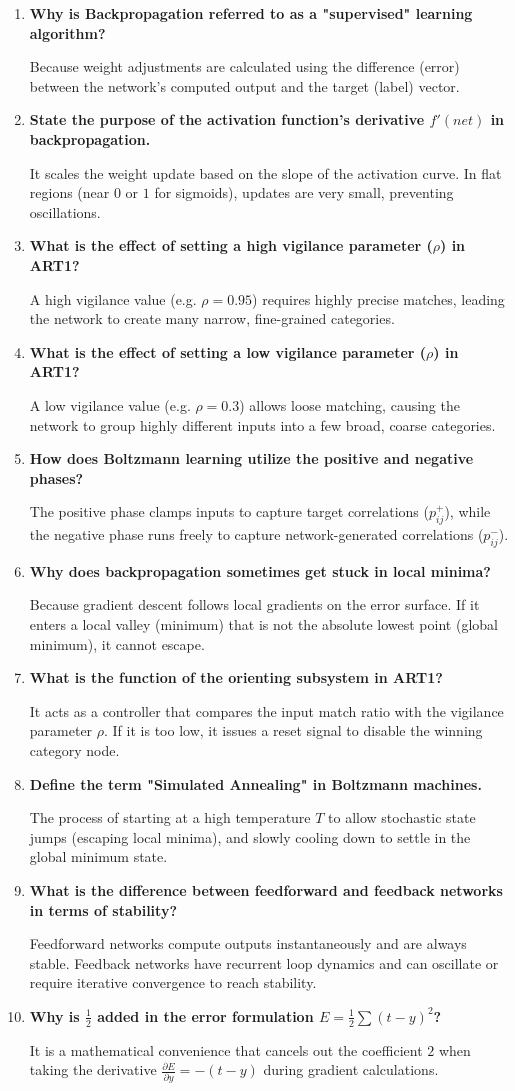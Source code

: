 \documentclass[12pt,a4paper]{article}
\newcommand{\Q}[1]{\textbf{#1}\par\noindent\ignorespaces}
\begin{document}
\begin{tcolorbox}[exambox, title={\textbf{Frequently Asked / Viva Questions}}]
\begin{enumerate}[leftmargin=*, itemsep=3.5pt, label=\arabic*.]
  \item \Q{Why is Backpropagation referred to as a "supervised" learning algorithm?} Because weight adjustments are calculated using the difference (error) between the network's computed output and the target (label) vector.
  \item \Q{State the purpose of the activation function's derivative $f'(net)$ in backpropagation.} It scales the weight update based on the slope of the activation curve. In flat regions (near $0$ or $1$ for sigmoids), updates are very small, preventing oscillations.
  \item \Q{What is the effect of setting a high vigilance parameter ($\rho$) in ART1?} A high vigilance value (e.g. $\rho = 0.95$) requires highly precise matches, leading the network to create many narrow, fine-grained categories.
  \item \Q{What is the effect of setting a low vigilance parameter ($\rho$) in ART1?} A low vigilance value (e.g. $\rho = 0.3$) allows loose matching, causing the network to group highly different inputs into a few broad, coarse categories.
  \item \Q{How does Boltzmann learning utilize the positive and negative phases?} The positive phase clamps inputs to capture target correlations ($p_{ij}^+$), while the negative phase runs freely to capture network-generated correlations ($p_{ij}^-$).
  \item \Q{Why does backpropagation sometimes get stuck in local minima?} Because gradient descent follows local gradients on the error surface. If it enters a local valley (minimum) that is not the absolute lowest point (global minimum), it cannot escape.
  \item \Q{What is the function of the orienting subsystem in ART1?} It acts as a controller that compares the input match ratio with the vigilance parameter $\rho$. If it is too low, it issues a reset signal to disable the winning category node.
  \item \Q{Define the term "Simulated Annealing" in Boltzmann machines.} The process of starting at a high temperature $T$ to allow stochastic state jumps (escaping local minima), and slowly cooling down to settle in the global minimum state.
  \item \Q{What is the difference between feedforward and feedback networks in terms of stability?} Feedforward networks compute outputs instantaneously and are always stable. Feedback networks have recurrent loop dynamics and can oscillate or require iterative convergence to reach stability.
  \item \Q{Why is $\frac{1}{2}$ added in the error formulation $E = \frac{1}{2}\sum(t-y)^2$?} It is a mathematical convenience that cancels out the coefficient $2$ when taking the derivative $\frac{\partial E}{\partial y} = -(t-y)$ during gradient calculations.
\end{enumerate}
\end{tcolorbox}
\end{document}
